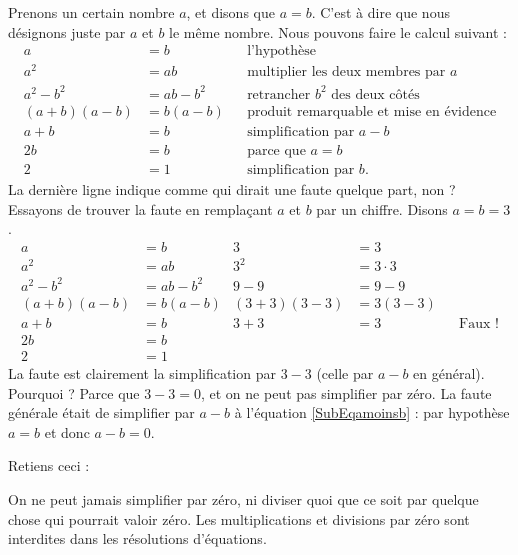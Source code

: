 Prenons un certain nombre $a$, et disons que $a=b$. C'est à dire que nous désignons juste par $a$ et $b$ le même nombre. Nous pouvons faire le calcul suivant :
\begin{subequations}
\begin{align}
a&=b&&\text{l'hypothèse}\\
a^{2}&=ab&&\text{multiplier les deux membres par $a$}\\
a^{2}-b^{2}&=ab-b^{2}&&\text{retrancher $b^{2}$ des deux côtés}\\
(a+b)(a-b)&=b(a-b)&&\text{produit remarquable et mise en évidence}\\
a+b&=b&&\text{simplification par $a-b$}  \label{SubEqamoinsb}\\
2b&=b&&\text{parce que $a=b$}\\
2&=1&&\text{simplification par $b$}.
\end{align}
\end{subequations}
La dernière ligne indique comme qui dirait une faute quelque part, non ? Essayons de trouver la faute en remplaçant $a$ et $b$ par un chiffre. Disons $a=b=3$.
\begin{subequations}
\begin{align}
a&=b&3&=3\\
a^{2}&=ab&3^{2}&=3\cdot 3\\
a^{2}-b^{2}&=ab-b^{2}&9-9&=9-9\\
(a+b)(a-b)&=b(a-b)&(3+3)(3-3)&=3(3-3)\\
a+b&=b&3+3&=3&&\text{Faux !}\\
2b&=b&&\\
2&=1&&
\end{align}
\end{subequations}
La faute est clairement la simplification par $3-3$ (celle par $a-b$ en général). Pourquoi ? Parce que $3-3=0$, et on ne peut pas simplifier par zéro. La faute générale était de simplifier par $a-b$ à l'équation \eqref{SubEqamoinsb} : par hypothèse $a=b$ et donc $a-b=0$.

Retiens ceci :

\setcounter{numloiphyz}{0}		%
\begin{loiphyz}  \label{PgLoiUnZero}
On ne peut jamais simplifier par zéro, ni diviser quoi que ce soit par quelque chose qui pourrait valoir zéro. Les multiplications et divisions par zéro sont interdites dans les résolutions d'équations.
\end{loiphyz}

